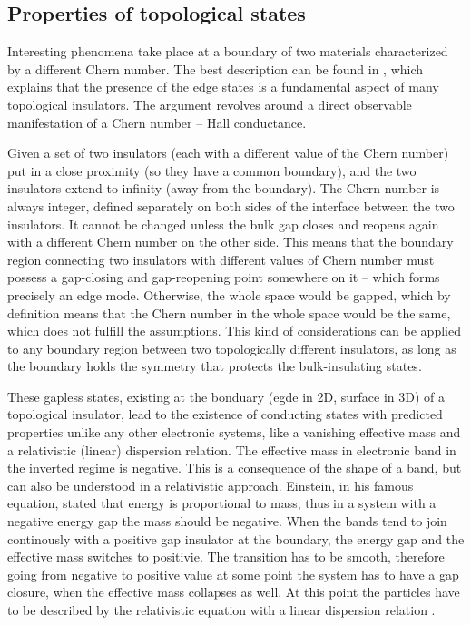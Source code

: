 \documentclass[titlepage,a4paper]{book}
\newcommand{\wciecie}{\quad\phantom{v}}
\begin{document}
\subsection{Properties of topological states}
\wciecie
Interesting phenomena take place at a boundary of two materials characterized by a different Chern number. The best description can be found in \cite{Bernevig_book}, which explains that the presence of the edge states is a fundamental aspect of many topological insulators. The argument revolves around a direct observable manifestation of a Chern number -- Hall conductance.

Given a set of two insulators (each with a different value of the Chern number) put in a close proximity (so they have a common boundary), and the two insulators extend to infinity (away from the boundary). The Chern number is always integer, defined separately on both sides of the interface between the two insulators. It cannot be changed unless the bulk gap closes and reopens again with a different Chern number on the other side. This means that the boundary region connecting two insulators with different values of Chern number must possess a gap-closing and gap-reopening point somewhere on it -- which forms precisely an edge mode. Otherwise, the whole space would be gapped, which by definition means that the Chern number in the whole space would be the same, which does not fulfill the assumptions. This kind of considerations can be applied to any boundary region between two topologically different insulators, as long as the boundary holds the symmetry that protects the bulk-insulating states. 

These gapless states, existing at the bonduary (egde in 2D, surface in 3D) of a topological insulator, lead to the existence of conducting states with predicted properties unlike any other electronic systems, like a vanishing effective mass and a relativistic (linear) dispersion relation. The effective mass in electronic band in the inverted regime is negative. This is a consequence of the shape of a band, but can also be understood in a relativistic approach. Einstein, in his famous equation, stated that energy is proportional to mass, thus in a system with a negative energy gap the mass should be negative. When the bands tend to join continously with a positive gap insulator at the boundary, the energy gap and the effective mass switches to positivie. The transition has to be smooth, therefore going from negative to positive value at some point the system has to have a gap closure, when the effective mass collapses as well. At this point the particles have to be described by the relativistic equation with a linear dispersion relation \cite{Zawadzki_Topology}.
\end{document}
